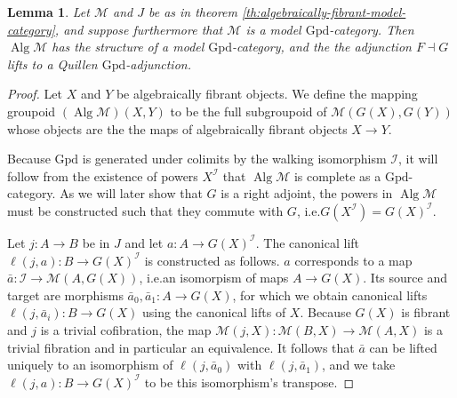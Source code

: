 \documentclass[a4paper]{article}
\newtheorem{lemma}[theorem]{Lemma}
\theoremstyle{remark}
\theoremstyle{definition}
\begin{document}
\begin{lemma}
  \label{lem:algebraically-fibrant-lproper-simplicial}
  Let $\mathcal{M}$ and $J$ be as in theorem \ref{th:algebraically-fibrant-model-category}, and suppose furthermore that $\mathcal{M}$ is a model $\mathrm{Gpd}$-category.
  Then $\operatorname{Alg} \mathcal{M}$ has the structure of a model $\mathrm{Gpd}$-category, and the the adjunction $F \dashv G$ lifts to a Quillen $\mathrm{Gpd}$-adjunction.
\end{lemma}
\begin{proof}
  Let $X$ and $Y$ be algebraically fibrant objects.
  We define the mapping groupoid $(\operatorname{Alg} \mathcal{M})(X, Y)$ to be the full subgroupoid of $\mathcal{M}(G(X), G(Y))$ whose objects are the the maps of algebraically fibrant objects $X \rightarrow Y$.

  Because $\mathrm{Gpd}$ is generated under colimits by the walking isomorphism $\mathcal{I}$, it will follow from the existence of powers $X^\mathcal{I}$ that $\operatorname{Alg} \mathcal{M}$ is complete as a $\mathrm{Gpd}$-category.
  As we will later show that $G$ is a right adjoint, the powers in $\operatorname{Alg} \mathcal{M}$ must be constructed such that they commute with $G$, i.e.\@ $G(X^\mathcal{I}) = G(X)^\mathcal{I}$.

  Let $j : A \rightarrow B$ be in $J$ and let $a : A \rightarrow G(X)^\mathcal{I}$.
  The canonical lift $\ell(j, a) : B \rightarrow G(X)^\mathcal{I}$ is constructed as follows.
  $a$ corresponds to a map $\bar a : \mathcal{I} \rightarrow \mathcal{M}(A, G(X))$, i.e.\@ an isomorpism of maps $A \rightarrow G(X)$.
  Its source and target are morphisms $\bar a_0, \bar a_1 : A \rightarrow G(X)$, for which we obtain canonical lifts $\ell(j, \bar a_i) : B \rightarrow G(X)$ using the canonical lifts of $X$.
  Because $G(X)$ is fibrant and $j$ is a trivial cofibration, the map $\mathcal{M}(j, X) : \mathcal{M}(B, X) \rightarrow \mathcal{M}(A, X)$ is a trivial fibration and in particular an equivalence.
  It follows that $\bar a$ can be lifted uniquely to an isomorphism of $\ell(j, \bar a_0)$ with $\ell(j, \bar a_1)$, and we take $\ell(j, a) : B \rightarrow G(X)^\mathcal{I}$ to be this isomorphism's transpose.


\end{proof}
\end{document}
